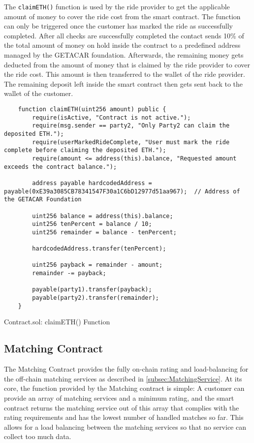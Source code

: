 The \texttt{claimETH()} function is used by the ride provider to get the applicable amount of money to cover the ride cost from the smart contract. The function can only be triggered once the customer has marked the ride as successfully completed. After all checks are successfully completed the contact sends 10\% of the total amount of money on hold inside the contract to a predefined address managed by the GETACAR foundation. Afterwards, the remaining money gets deducted from the amount of money that is claimed by the ride provider to cover the ride cost. This amount is then transferred to the wallet of the ride provider. The remaining deposit left inside the smart contract then gets sent back to the wallet of the customer. 

\lstset{
  basicstyle=\footnotesize\ttfamily,
  breaklines=true,
  numbers=left,
  firstnumber=232
}

\begin{Listing}
\begin{lstlisting}
    function claimETH(uint256 amount) public {
        require(isActive, "Contract is not active.");
        require(msg.sender == party2, "Only Party2 can claim the deposited ETH.");
        require(userMarkedRideComplete, "User must mark the ride complete before claiming the deposited ETH.");
        require(amount <= address(this).balance, "Requested amount exceeds the contract balance.");
        
        address payable hardcodedAddress = payable(0xE39a3085CB78341547F30a1C6bD12977d51aa967);  // Address of the GETACAR Foundation

        uint256 balance = address(this).balance;
        uint256 tenPercent = balance / 10;
        uint256 remainder = balance - tenPercent;

        hardcodedAddress.transfer(tenPercent);

        uint256 payback = remainder - amount;
        remainder -= payback;

        payable(party1).transfer(payback);
        payable(party2).transfer(remainder);
    }
\end{lstlisting}
  \caption{Contract.sol: claimETH() Function}
  \label{lst:claimETH}
\end{Listing}


\subsection{Matching Contract}

The Matching Contract provides the fully on-chain rating and load-balancing for the off-chain matching services as described in \ref{subsec:MatchingService}. At its core, the function provided by the Matching contract is simple: A customer can provide an array of matching services and a minimum rating, and the smart contract returns the matching service out of this array that complies with the rating requirements and has the lowest number of handled matches so far. This allows for a load balancing between the matching services so that no service can collect too much data.

